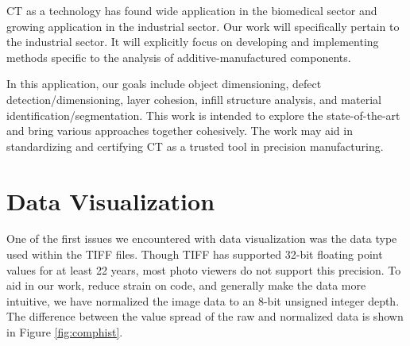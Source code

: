 \documentclass[11pt, letterpaper, notitlepage]{article}
\begin{document}
\begin{multicols}{2}

CT as a technology has found wide application in the biomedical sector and growing application in the industrial sector. Our work will specifically pertain to the industrial sector. It will explicitly focus on developing and implementing methods specific to the analysis of additive-manufactured components. 

In this application, our goals include object dimensioning, defect detection/dimensioning, layer cohesion, infill structure analysis, and material identification/segmentation. This work is intended to explore the state-of-the-art and bring various approaches together cohesively. The work may aid in standardizing and certifying CT as a trusted tool in precision manufacturing.

\section{Data Visualization}
One of the first issues we encountered with data visualization was the data type used within the TIFF files. Though TIFF has supported 32-bit floating point values for at least 22 years, most photo viewers do not support this precision. To aid in our work, reduce strain on code, and generally make the data more intuitive, we have normalized the image data to an 8-bit unsigned integer depth. The difference between the value spread of the raw and normalized data is shown in Figure \ref{fig:comphist}.


\end{multicols}
\end{document}
